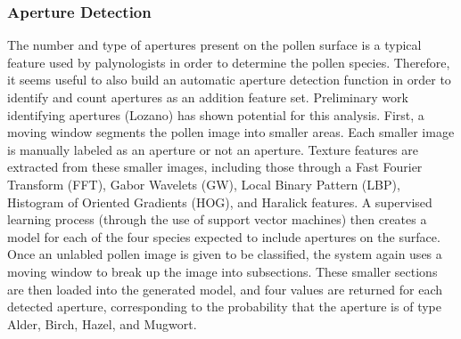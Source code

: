 \subsubsection{Aperture Detection}

The number and type of apertures present on the pollen surface is a typical feature used by palynologists in order to determine the pollen species. Therefore, it seems useful to also build an automatic aperture detection function in order to identify and count apertures as an addition feature set. Preliminary work identifying apertures (Lozano) has shown potential for this analysis.
First, a moving window segments the pollen image into smaller areas. Each smaller image is manually labeled as an aperture or not an aperture. Texture features are extracted from these smaller images, including those through a Fast Fourier Transform (FFT), Gabor Wavelets (GW), Local Binary Pattern (LBP), Histogram of Oriented Gradients (HOG), and Haralick features. A supervised learning process (through the use of support vector machines) then creates a model for each of the four species expected to include apertures on the surface.
Once an unlabled pollen image is given to be classified, the system again uses a moving window to break up the image into subsections. These smaller sections are then loaded into the generated model, and four values are returned for each detected aperture, corresponding to the probability that the aperture is of type Alder, Birch, Hazel, and Mugwort. 

    
    
  
  
  
  
  